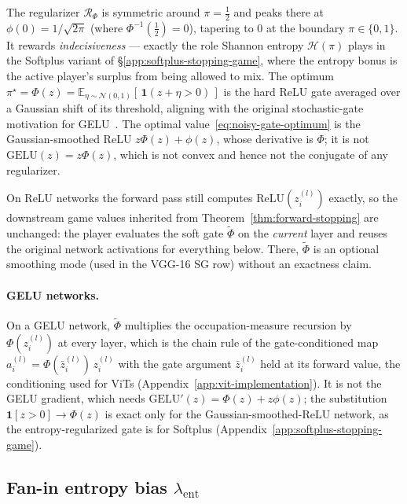 \documentclass[twoside]{article}
\providecommand{\E}{}
\renewcommand{\E}{\mathbb{E}}
\newcommand{\relu}{\text{ReLU}}
\newcommand{\1}{\mathbf{1}}
\begin{document}
The regularizer $\mathcal{R}_\Phi$ is symmetric around $\pi = \tfrac12$ and peaks there at $\phi(0)
    = 1/\sqrt{2\pi}$ (where $\Phi^{-1}(\tfrac12) = 0$), tapering to $0$ at the boundary
$\pi\in\{0,1\}$. It rewards \emph{indecisiveness} --- exactly the role Shannon entropy
$\mathcal{H}(\pi)$ plays in the Softplus variant of \S\ref{app:softplus-stopping-game}, where the
entropy bonus is the active player's surplus from being allowed to mix. The optimum $\pi^\star =
    \Phi(z) = \E_{\eta\sim\mathcal{N}(0,1)}[\,\1(z+\eta > 0)\,]$ is the hard ReLU gate averaged over a
Gaussian shift of its threshold, aligning with the original stochastic-gate motivation for
\acs{GELU}~\citep{Hendrycks2016gelu}. The optimal value~\eqref{eq:noisy-gate-optimum} is the
Gaussian-smoothed \acs{ReLU} $z\Phi(z) + \phi(z)$, whose derivative is $\Phi$; it is not
$\mathrm{GELU}(z) = z\Phi(z)$, which is not convex and hence not the conjugate of any regularizer.

On \ac{ReLU} networks the forward pass still computes $\relu(z_i^{(l)})$ exactly, so the downstream
game values inherited from Theorem~\ref{thm:forward-stopping} are unchanged: the player evaluates
the soft gate $\tilde\Phi$ on the \emph{current} layer and reuses the original network activations
for everything below. There, $\tilde\Phi$ is an optional smoothing mode (used in the VGG-16 \ac{SG}
row) without an exactness claim.

\paragraph{\acs{GELU} networks.}\label{app:gelu-noisy-gate}
On a \acs{GELU} network, $\tilde\Phi$ multiplies the occupation-measure recursion by
$\Phi(z_i^{(l)})$ at every layer, which is the chain rule of the gate-conditioned map $a_i^{(l)} =
    \Phi(\bar z_i^{(l)})\, z_i^{(l)}$ with the gate argument $\bar z_i^{(l)}$ held at its forward
value, the conditioning used for \acs{ViT}s (Appendix~\ref{app:vit-implementation}). It is not the
\acs{GELU} gradient, which needs $\mathrm{GELU}'(z) = \Phi(z) + z\phi(z)$; the substitution
$\1[z>0] \to \Phi(z)$ is exact only for the Gaussian-smoothed-\acs{ReLU} network, as the
entropy-regularized gate is for Softplus (Appendix~\ref{app:softplus-stopping-game}).

\subsection{\texorpdfstring{Fan-in entropy bias $\lambda_{\mathrm{ent}}$}{Fan-in entropy bias lambda\_ent}}\label{app:entropy-mode}
\end{document}
